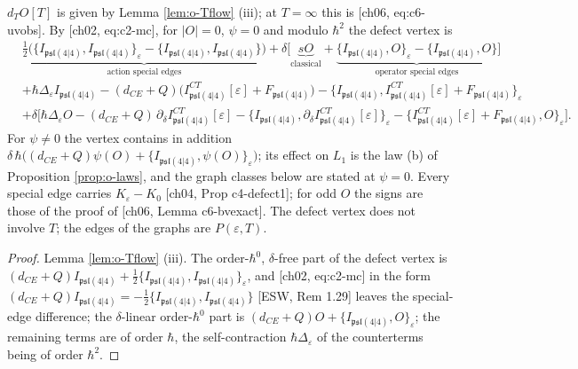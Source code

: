\begin{proposition}
\label{prop:o-uv}
$d_TO[T]$ is given by Lemma \ref{lem:o-Tflow} (iii); at $T=\infty$ this is [ch06, eq:c6-uvobs]. By [ch02, eq:c2-mc], for $|O|=0$, $\psi=0$ and modulo $\hbar^2$ the defect vertex is
\begin{equation}
\begin{aligned}
&\underbrace{\tfrac12\big(\{I_{\mathfrak{psl}(4|4)},I_{\mathfrak{psl}(4|4)}\}_\varepsilon-\{I_{\mathfrak{psl}(4|4)},I_{\mathfrak{psl}(4|4)}\}\big)}_{\text{action special edges}}+\delta\Big[\underbrace{sO}_{\text{classical}}+\underbrace{\{I_{\mathfrak{psl}(4|4)},O\}_\varepsilon-\{I_{\mathfrak{psl}(4|4)},O\}}_{\text{operator special edges}}\Big]\\
&+\hbar\Delta_\varepsilon I_{\mathfrak{psl}(4|4)}-(d_{CE}+Q)\big(I^{CT}_{\mathfrak{psl}(4|4)}[\varepsilon]+F_{\mathfrak{psl}(4|4)}\big)-\big\{I_{\mathfrak{psl}(4|4)},I^{CT}_{\mathfrak{psl}(4|4)}[\varepsilon]+F_{\mathfrak{psl}(4|4)}\big\}_\varepsilon\\
&+\delta\Big[\hbar\Delta_\varepsilon O-(d_{CE}+Q)\,\partial_\delta I^{CT}_{\mathfrak{psl}(4|4)}[\varepsilon]-\big\{I_{\mathfrak{psl}(4|4)},\partial_\delta I^{CT}_{\mathfrak{psl}(4|4)}[\varepsilon]\big\}_\varepsilon-\big\{I^{CT}_{\mathfrak{psl}(4|4)}[\varepsilon]+F_{\mathfrak{psl}(4|4)},O\big\}_\varepsilon\Big].
\end{aligned}
\label{eq:o-defect}
\end{equation}
For $\psi\neq0$ the vertex contains in addition $\delta\,\hbar\big((d_{CE}+Q)\psi(O)+\{I_{\mathfrak{psl}(4|4)},\psi(O)\}_\varepsilon\big)$; its effect on $L_1$ is the law (b) of Proposition \ref{prop:o-laws}, and the graph classes below are stated at $\psi=0$. Every special edge carries $K_\varepsilon-K_0$ [ch04, Prop c4-defect1]; for odd $O$ the signs are those of the proof of [ch06, Lemma c6-bvexact]. The defect vertex does not involve $T$; the edges of the graphs are $P(\varepsilon,T)$.
\end{proposition}

\begin{proof}
Lemma \ref{lem:o-Tflow} (iii). The order-$\hbar^0$, $\delta$-free part of the defect vertex is $(d_{CE}+Q)I_{\mathfrak{psl}(4|4)}+\tfrac12\{I_{\mathfrak{psl}(4|4)},I_{\mathfrak{psl}(4|4)}\}_\varepsilon$, and [ch02, eq:c2-mc] in the form $(d_{CE}+Q)I_{\mathfrak{psl}(4|4)}=-\tfrac12\{I_{\mathfrak{psl}(4|4)},I_{\mathfrak{psl}(4|4)}\}$ [ESW, Rem 1.29] leaves the special-edge difference; the $\delta$-linear order-$\hbar^0$ part is $(d_{CE}+Q)O+\{I_{\mathfrak{psl}(4|4)},O\}_\varepsilon$; the remaining terms are of order $\hbar$, the self-contraction $\hbar\Delta_\varepsilon$ of the counterterms being of order $\hbar^2$.
\end{proof}

